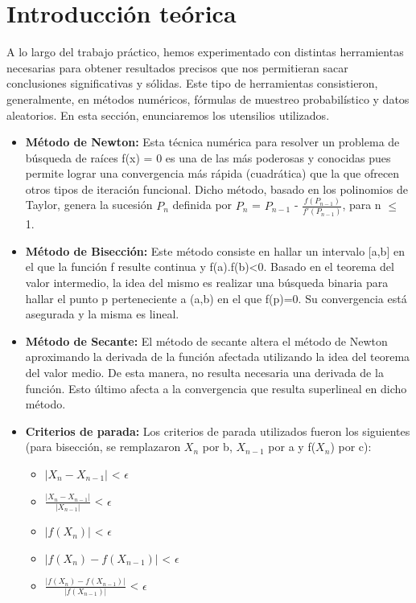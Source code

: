 \documentclass[10pt, a4paper]{article}
\begin{document}
\newpage
\thispagestyle{empty}

\tableofcontents

\newpage

\section{Introducci\'on te\'orica}

A lo largo del trabajo pr\'actico, hemos experimentado con distintas herramientas necesarias para obtener resultados precisos que nos permitieran sacar conclusiones significativas y s\'olidas. Este tipo de herramientas consistieron, generalmente, en m\'etodos num\'ericos, f\'ormulas de muestreo probabil\'istico y datos aleatorios. En esta secci\'on, enunciaremos los utensilios utilizados. 
\begin{itemize}
\item \textbf{M\'etodo de Newton:} Esta t\'ecnica num\'erica para resolver un problema de b\'usqueda de ra\'ices f(x) = 0 es una de las m\'as poderosas y conocidas pues permite lograr una convergencia m\'as r\'apida (cuadr\'atica) que la que ofrecen otros tipos de iteraci\'on funcional. Dicho m\'etodo, basado en los polinomios de Taylor, genera la sucesi\'on ${P_{n}}$ definida por $P_{n}$ = $P_{n-1}$ - $\frac{f(P_{n-1})}{f'(P_{n-1})}$, para n $\leq$ 1.

\item \textbf{M\'etodo de Bisecci\'on:} Este m\'etodo consiste en hallar un intervalo [a,b] en el que la funci\'on f resulte continua y f(a).f(b)<0. Basado en el teorema del valor intermedio, la idea del mismo es realizar una b\'usqueda binaria para hallar el punto p perteneciente a (a,b) en el que f(p)=0. Su convergencia est\'a asegurada y la misma es lineal.

\item \textbf{M\'etodo de Secante:} El m\'etodo de secante altera el m\'etodo de Newton aproximando la derivada de la funci\'on afectada utilizando la idea del teorema del valor medio. De esta manera, no resulta necesaria una derivada de la funci\'on. Esto \'ultimo afecta a la convergencia que resulta superlineal en dicho m\'etodo.

\item \textbf{Criterios de parada:} Los criterios de parada utilizados fueron los siguientes (para bisecci\'on, se remplazaron $X_{n}$ por b, $X_{n-1}$ por a y f($X_{n}$) por c):
\begin{itemize}
  \item$|X_{n} - X_{n-1}|$ < $\epsilon$
  \item$\frac{|X_{n} - X_{n-1}|}{|X_{n-1}|}$ < $\epsilon$
  \item$|f(X_{n})|$ < $\epsilon$
  \item$|f(X_{n}) - f(X_{n-1})|$ < $\epsilon$
  \item$\frac{|f(X_{n}) - f(X_{n-1})|}{|f(X_{n-1})|}$ < $\epsilon$
\end{itemize}


\end{itemize}
\end{document}
